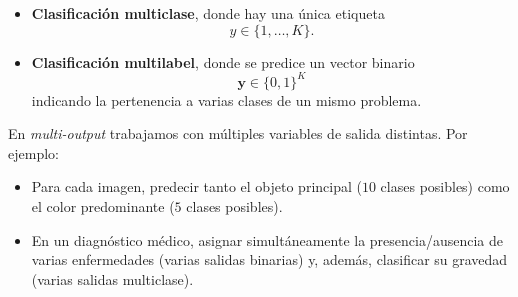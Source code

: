 \documentclass{article}
\begin{document}
\begin{itemize}
  \item \textbf{Clasificación multiclase}, donde hay una única etiqueta
  \[
    y \in \{1,\dots,K\}.
  \]
  \item \textbf{Clasificación multilabel}, donde se predice un vector binario
  \[
    \mathbf{y} \in \{0,1\}^K
  \]
  indicando la pertenencia a varias clases de un mismo problema.
\end{itemize}

En \emph{multi-output} trabajamos con múltiples variables de salida distintas. Por ejemplo:

\begin{itemize}
  \item Para cada imagen, predecir tanto el objeto principal (\(10\) clases posibles) como el color predominante (\(5\) clases posibles).
  \item En un diagnóstico médico, asignar simultáneamente la presencia/ausencia de varias enfermedades (varias salidas binarias) y, además, clasificar su gravedad (varias salidas multiclase).
\end{itemize}
\end{document}

